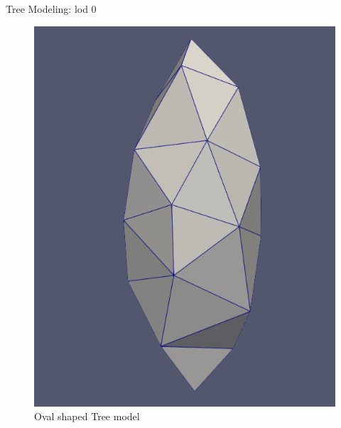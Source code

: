 \documentclass[10pt]{beamer}
\begin{document}
\begin{frame}{Tree Modeling: lod 0}
	\begin{figure}[h]
		\centering
		\begin{minipage}{0.49\textwidth}
			\centering
			\includegraphics[width=\textwidth]{images/oval.png}
			\caption{Oval shaped Tree model}
			\label{fig:figure1}
		\end{minipage}\hfill
		\begin{minipage}{0.49\textwidth}
			\centering

\end{minipage}
\end{figure}
\end{frame}
\end{document}
